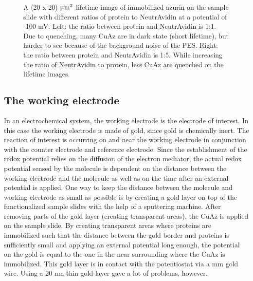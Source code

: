 \documentclass[twoside,single]{lion-msc}
\begin{document}
\begin{figure}
\begin{subfigure}{.5\textwidth}
  \label{}
\end{subfigure}
\caption{A (20 x 20) $\upmu \textup{m}^{2}$ lifetime image of immobilized azurin on the sample slide with different ratios of protein to NeutrAvidin at a potential of -100 mV. Left: the ratio between protein and NeutrAvidin is 1:1. Due to quenching, many CuAz are in dark state (short lifetime), but harder to see because of the background noise of the PES.  Right: the ratio between protein and NeutrAvidin is 1:5. While increasing the ratio of NeutrAvidin to protein, less CuAz are quenched on the lifetime images.}
\label{finding_proteins}
\end{figure}


\subsection{The working electrode}
In an electrochemical system, the working electrode is the electrode of interest. In this case the working electrode is made of gold, since gold is chemically inert. The reaction of interest is occurring on and near the working electrode in conjunction with the counter electrode and reference electrode. Since the establishment of the redox potential relies on the diffusion of the electron mediator, the actual redox potential sensed by the molecule is dependent on the distance between the working electrode and the molecule as well as on the time after an external potential is applied. One way to keep the distance between the molecule and working electrode as small as possible is by creating a gold layer on top of the functionalized sample slides with the help of a sputtering machine. After removing parts of the gold layer (creating transparent areas), the CuAz is applied on the sample slide. By creating transparent areas where proteins are immobilized such that the distance between the gold border and proteins is sufficiently small and applying an external potential long enough, the potential on the gold is equal to the one in the near surrounding where the CuAz is immobilized. This gold layer is in contact with the potentiostat via a  mm gold wire. Using a 20 nm thin gold layer gave a lot of problems, however.
\end{document}
